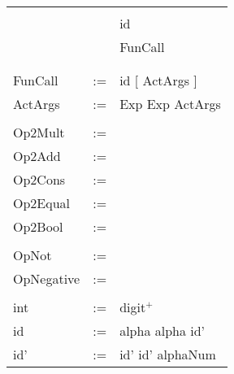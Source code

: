 \documentclass[14pt]{amsart}
\makeatletter
\newcommand \listoftodos{\section*{Todo list} \@starttoc{tdo}}
\makeatother
\begin{document}
\begin{tabular}[t]{p{2.5cm} c p{10cm}}
		& \I & \tok{True}				\\
		& \I & id					\\
		& \I & FunCall					\\
		& \I & \tok{[]}					\\
&&\\
FunCall		& := & id \tok{(} [ ActArgs ] \tok{)}		\\
ActArgs		& := & Exp \I Exp \tok{,} ActArgs		\\
&&\\
Op2Mult		& := & \tok{$\ast$} \I \tok{/} \I \tok{\%} 	\\
Op2Add		& := & \tok{+} \I \tok{-}			\\
Op2Cons		& := & \tok{:}					\\
Op2Equal	& := & \tok{==} \I \tok{<} \I \tok{>} \I \tok{<=} \I \tok{>=} \I \tok{!=} \\
Op2Bool		& := & \tok{\&\&} \I \tok{||}			\\
&&\\
OpNot		& := & \tok{!}					\\
OpNegative	& := & \tok{-}					\\
&&\\
int		& := & digit$^+$				\\
id		& := & alpha \I alpha id'			\\
id'		& := & id' \tok{\_} \I id' alphaNum
\end{tabular}

\end{document}
